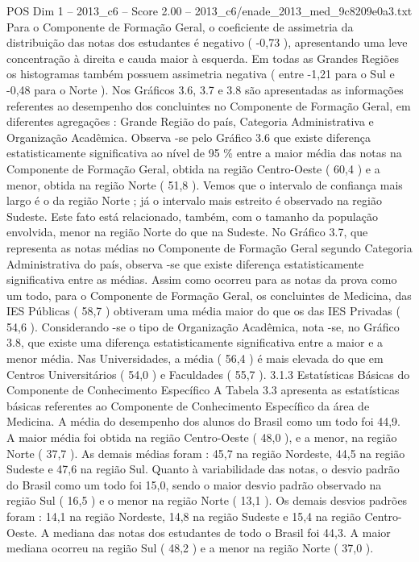 \begin{textsample}{POS Dim 1 – 2013\_c6 – Score 2.00 – 2013\_c6/enade\_2013\_med\_9c8209e0a3.txt}
Para o Componente de Formação Geral, o coeficiente de assimetria da distribuição das notas dos estudantes é negativo ( -0,73 ), apresentando uma leve concentração à direita e cauda maior à esquerda.
Em todas as Grandes Regiões os histogramas também possuem assimetria negativa ( entre -1,21 para o Sul e -0,48 para o Norte ).
Nos Gráficos 3.6, 3.7 e 3.8 são apresentadas as informações referentes ao desempenho dos concluintes no Componente de Formação Geral, em diferentes agregações : Grande Região do país, Categoria Administrativa e Organização Acadêmica.
Observa -se pelo Gráfico 3.6 que existe diferença estatisticamente significativa ao nível de 95 \% entre a maior média das notas na Componente de Formação Geral, obtida na região Centro-Oeste ( 60,4 ) e a menor, obtida na região Norte ( 51,8 ).
Vemos que o intervalo de confiança mais largo é o da região Norte ; já o intervalo mais estreito é observado na região Sudeste.
Este fato está relacionado, também, com o tamanho da população envolvida, menor na região Norte do que na Sudeste.
No Gráfico 3.7, que representa as notas médias no Componente de Formação Geral segundo Categoria Administrativa do país, observa -se que existe diferença estatisticamente significativa entre as médias.
Assim como ocorreu para as notas da prova como um todo, para o Componente de Formação Geral, os concluintes de Medicina, das IES Públicas ( 58,7 ) obtiveram uma média maior do que os das IES Privadas ( 54,6 ).
Considerando -se o tipo de Organização Acadêmica, nota -se, no Gráfico 3.8, que existe uma diferença estatisticamente significativa entre a maior e a menor média.
Nas Universidades, a média ( 56,4 ) é mais elevada do que em Centros Universitários ( 54,0 ) e Faculdades ( 55,7 ). 3.1.3 Estatísticas Básicas do Componente de Conhecimento Específico A Tabela 3.3 apresenta as estatísticas básicas referentes ao Componente de Conhecimento Específico da área de Medicina.
A média do desempenho dos alunos do Brasil como um todo foi 44,9.
A maior média foi obtida na região Centro-Oeste ( 48,0 ), e a menor, na região Norte ( 37,7 ).
As demais médias foram : 45,7 na região Nordeste, 44,5 na região Sudeste e 47,6 na região Sul.
Quanto à variabilidade das notas, o desvio padrão do Brasil como um todo foi 15,0, sendo o maior desvio padrão observado na região Sul ( 16,5 ) e o menor na região Norte ( 13,1 ).
Os demais desvios padrões foram : 14,1 na região Nordeste, 14,8 na região Sudeste e 15,4 na região Centro-Oeste.
A mediana das notas dos estudantes de todo o Brasil foi 44,3.
A maior mediana ocorreu na região Sul ( 48,2 ) e a menor na região Norte ( 37,0 ).

\end{textsample}
